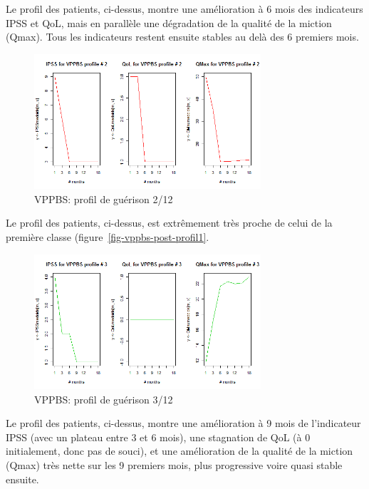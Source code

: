Le profil des patients, ci-dessus, montre une amélioration à 6 mois des indicateurs IPSS et QoL, mais en parallèle une dégradation de la qualité de la miction (Qmax). Tous les indicateurs restent ensuite stables au delà des 6 premiers mois.

\begin{figure}[H]
\centering
\includegraphics[width=0.75\textwidth]{../Fig/VPPBS/vppbs-profil-post-02.png}
\caption{VPPBS: profil de guérison 2/12}
\label{fig-vppbs-post-profil2}
\end{figure}

Le profil des patients, ci-dessus, est extrêmement très proche de celui de la première classe (figure~\ref{fig-vppbs-post-profil1}.

\begin{figure}[H]
\centering
\includegraphics[width=0.75\textwidth]{../Fig/VPPBS/vppbs-profil-post-03.png}
\caption{VPPBS: profil de guérison 3/12}
\label{fig-vppbs-post-profil3}
\end{figure}

Le profil des patients, ci-dessus, montre une amélioration à 9 mois de l'indicateur IPSS (avec un plateau entre 3 et 6 mois), une stagnation de QoL (à 0 initialement, donc pas de souci), et une amélioration de la qualité de la miction (Qmax) très nette sur les 9 premiers mois, plus progressive voire quasi stable ensuite.

